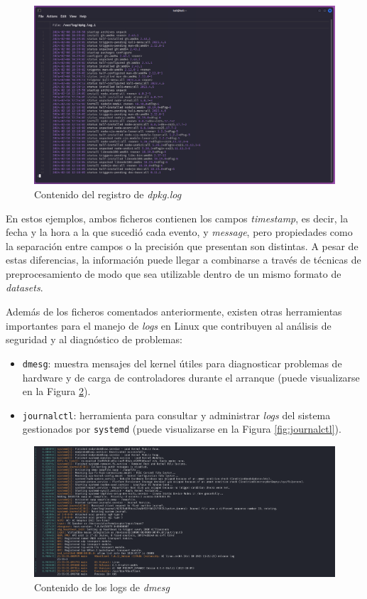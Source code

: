 \begin{figure}[H]
    \centering
    \includegraphics[width=\linewidth]{imagenes/log-structure-2.png}
    \caption{Contenido del registro de \textit{dpkg.log}}
    \label{fig:dpkg-log}
\end{figure}

\newpage

En estos ejemplos, ambos ficheros contienen los campos \textit{timestamp}, es decir, la fecha y la hora a la que sucedió cada evento, y \textit{message}, pero propiedades como la separación entre campos o la precisión que presentan son distintas. A pesar de estas diferencias, la información puede llegar a combinarse a través de técnicas de preprocesamiento de modo que sea utilizable dentro de un mismo formato de \textit{datasets}. 

Además de los ficheros comentados anteriormente, existen otras herramientas importantes para el manejo de \textit{logs} en Linux que contribuyen al análisis de seguridad y al diagnóstico de problemas:

\begin{itemize}
    \item \verb|dmesg|: muestra mensajes del kernel útiles para diagnosticar problemas de hardware y de carga de controladores durante el arranque (puede visualizarse en la Figura \ref{fig:dmesg}).
    \item \verb|journalctl|: herramienta para consultar y administrar \textit{logs} del sistema gestionados por \verb|systemd| (puede visualizarse en la Figura \ref{fig:journalctl}).
\end{itemize}

\begin{figure} [H]
    \centering
    \includegraphics[width=1\linewidth]{imagenes/dmesg.png}
    \caption{Contenido de los logs de \textit{dmesg}}
    \label{fig:dmesg}
\end{figure}

